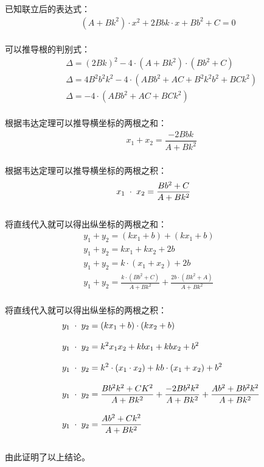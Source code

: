\documentclass[UTF8]{ctexart}
\begin{document}
    已知联立后的表达式：
    \begin{align}
        \left(A+Bk^2\right)\cdot x^2+2Bbk\cdot x+Bb^2+C=0
    \end{align}\\
    可以推导根的判别式：
    \begin{align}
        &\Delta=(2Bk)^2-4\cdot\left(A+Bk^2\right)\cdot\left(Bb^2+C\right)\\[3mm]
        &\Delta=4B^2b^2k^2-4\cdot\left(ABb^2+AC+B^2k^2b^2+BCk^2\right)\\[3mm]
        &\Delta=-4\cdot\left(ABb^2+AC+BCk^2\right)
    \end{align}\\
    根据韦达定理可以推导横坐标的两根之和：
    \begin{align}
        &x_1+x_2=\dfrac{-2Bbk}{A+Bk^2}
    \end{align}\\
    根据韦达定理可以推导横坐标的两根之积：
    \begin{align}
        &x_1\hspace{3.0pt}\cdot\hspace{3.0pt}x_2=\dfrac{Bb^2+C}{A+Bk^2}
    \end{align}\\    
    将直线代入就可以得出纵坐标的两根之和：\vspace{3pt}
    \begin{align}
        &y_1+y_2=(kx_1+b)+(kx_1+b)\\[3mm]
        &y_1+y_2=kx_1+kx_2+2b\\[3mm]
        &y_1+y_2=k\cdot(x_1+x_2)+2b\\[3mm]
        &y_1+y_2=\frac{k\cdot(Bb^2+C)}{A+Bk^2}+\frac{2b\cdot(Bk^2+A)}{A+Bk^2}~~~~~~~~~~~~~~
    \end{align}\\
    将直线代入就可以得出纵坐标的两根之积：\vspace{3pt}
    \begin{align}
        &~~y_1\hspace{3.0pt}\cdot\hspace{3.0pt}y_2=(kx_1+b)\cdot(kx_2+b)\\[3mm]
        &~~y_1\hspace{3.0pt}\cdot\hspace{3.0pt}y_2=k^2x_1x_2+kbx_1+kbx_2+b^2\\[3mm]
        &~~y_1\hspace{3.0pt}\cdot\hspace{3.0pt}y_2=k^2\cdot(x_1\cdot x_2)+kb\cdot(x_1+x_2)+b^2\\[3mm]
        &~~y_1\hspace{3.0pt}\cdot\hspace{3.0pt}y_2=\frac{Bb^2k^2+CK^2}{A+Bk^2}+\frac{-2Bb^2k^2}{A+Bk^2}+\frac{Ab^2+Bb^2k^2}{A+Bk^2}\\[3mm]
        &~~y_1\hspace{3.0pt}\cdot\hspace{3.0pt}y_2=\frac{Ab^2+Ck^2}{A+Bk^2}
    \end{align}\\
    由此证明了以上结论。
\end{document}
